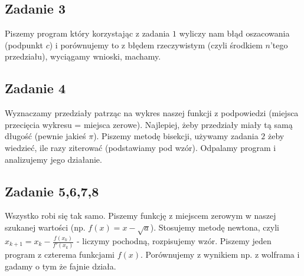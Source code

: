 \documentclass[a4paper]{article}
\begin{document}
\subsection*{Zadanie 3}
Piszemy program który korzystając z zadania $1$ wyliczy nam błąd oszacowania (podpunkt $c$) i porównujemy to z błędem rzeczywistym (czyli środkiem $n$'tego przedziału), wyciągamy wnioski, machamy.

\subsection*{Zadanie 4}
Wyznaczamy przedziały patrząc na wykres naszej funkcji z podpowiedzi (miejsca przecięcia wykresu = miejsca zerowe). Najlepiej, żeby przedziały miały tą samą długość (pewnie jakieś $\pi$). Piszemy metodę bisekcji, używamy zadania $2$ żeby wiedzieć, ile razy ziterować (podstawiamy pod wzór). Odpalamy program i analizujemy jego działanie.

\subsection*{Zadanie 5,6,7,8}
Wszystko robi się tak samo. Piszemy funkcję z miejscem zerowym w naszej szukanej wartości (np. $f(x)=x-\sqrt{a}$). Stosujemy metodę newtona, czyli $x_{k+1}=x_k-\frac{f(x_k)}{f'(x_k)}$ - liczymy pochodną, rozpisujemy wzór. Piszemy jeden program z czterema funkcjami $f(x)$. Porównujemy z wynikiem np. z wolframa i gadamy o tym że fajnie działa.
\end{document}
